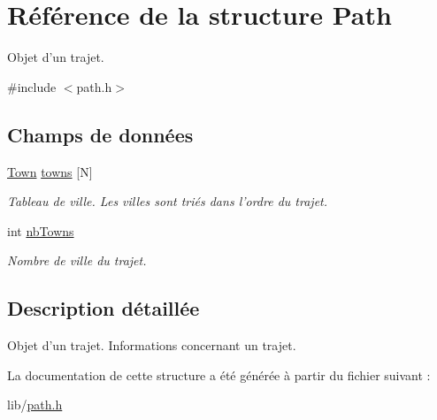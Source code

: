 \hypertarget{structPath}{
\section{Référence de la structure Path}
\label{structPath}
}


Objet d'un trajet.  




{\ttfamily \#include $<$path.h$>$}

\subsection*{Champs de données}
\begin{DoxyCompactItemize}
\item 
\hypertarget{structPath_aa6e2db030cf042e7ae3fe053fa6f0195}{
\hyperlink{structTown}{Town} \hyperlink{structPath_aa6e2db030cf042e7ae3fe053fa6f0195}{towns} \mbox{[}N\mbox{]}}
\label{structPath_aa6e2db030cf042e7ae3fe053fa6f0195}

\begin{DoxyCompactList}\small\item\em Tableau de ville. Les villes sont triés dans l'ordre du trajet. \item\end{DoxyCompactList}\item 
\hypertarget{structPath_a3caeb081a51e3fb89e638aa4bccd2110}{
int \hyperlink{structPath_a3caeb081a51e3fb89e638aa4bccd2110}{nbTowns}}
\label{structPath_a3caeb081a51e3fb89e638aa4bccd2110}

\begin{DoxyCompactList}\small\item\em Nombre de ville du trajet. \item\end{DoxyCompactList}\end{DoxyCompactItemize}


\subsection{Description détaillée}
Objet d'un trajet. Informations concernant un trajet. 

La documentation de cette structure a été générée à partir du fichier suivant :\begin{DoxyCompactItemize}
\item 
lib/\hyperlink{path_8h}{path.h}\end{DoxyCompactItemize}
